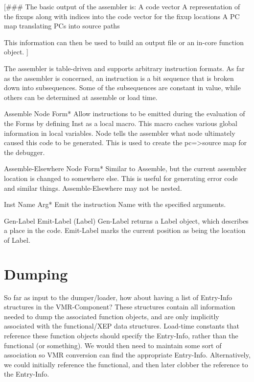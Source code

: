 [\#\#\# The basic output of the assembler is:
    A code vector
    A representation of the fixups along with indices into the code vector for
      the fixup locations
    A PC map translating PCs into source paths

This information can then be used to build an output file or an in-core
function object.
]

The assembler is table-driven and supports arbitrary instruction formats.  As
far as the assembler is concerned, an instruction is a bit sequence that is
broken down into subsequences.  Some of the subsequences are constant in value,
while others can be determined at assemble or load time.

Assemble Node Form*
    Allow instructions to be emitted during the evaluation of the Forms by
    defining Inst as a local macro.  This macro caches various global
    information in local variables.  Node tells the assembler what node
    ultimately caused this code to be generated.  This is used to create the
    pc=>source map for the debugger.

Assemble-Elsewhere Node Form*
    Similar to Assemble, but the current assembler location is changed to
    somewhere else.  This is useful for generating error code and similar
    things.  Assemble-Elsewhere may not be nested.

Inst Name Arg*
    Emit the instruction Name with the specified arguments.

Gen-Label
Emit-Label (Label)
    Gen-Label returns a Label object, which describes a place in the code.
    Emit-Label marks the current position as being the location of Label.



\chapter{Dumping}

So far as input to the dumper/loader, how about having a list of Entry-Info
structures in the VMR-Component?  These structures contain all information
needed to dump the associated function objects, and are only implicitly
associated with the functional/XEP data structures.  Load-time constants that
reference these function objects should specify the Entry-Info, rather than the
functional (or something).  We would then need to maintain some sort of
association so VMR conversion can find the appropriate Entry-Info.
Alternatively, we could initially reference the functional, and then later
clobber the reference to the Entry-Info.

